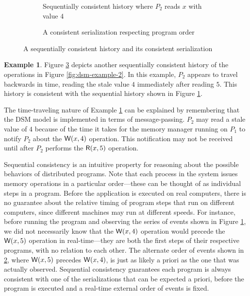 \documentclass[]             %
{NASA}                       %
\theoremstyle{definition}
\newtheorem{example}[theorem]{Example}
\begin{document}
\begin{figure}
  \begin{subfigure}{1\textwidth}
    \setlength\belowcaptionskip{4ex}
    \centering
    
    \caption{Sequentially consistent history where $P_2$ reads $x$ with value $4$}
    \label{fig:dsm-example-2-sequential-2-sub}
  \end{subfigure}
  \begin{subfigure}{1\textwidth}
    
    \caption{A consistent serialization respecting program order}
    \label{fig:dsm-example-2-sequential-2-serial}
  \end{subfigure}
  \caption{A sequentially consistent history and its consistent serialization}
  \label{fig:dsm-example-2-sequential-2}
\end{figure}

\begin{example}
  \label{ex:dsm-example-2-sequential-2}
  Figure \ref{fig:dsm-example-2-sequential-2} depicts another
  sequentially consistent history of the operations in Figure
  \ref{fig:dsm-example-2}. In this example, $P_2$ appears to travel
  backwards in time, reading the stale value $4$ immediately after
  reading $5$. This history is consistent with the sequential history
  shown in Figure \ref{fig:dsm-example-2-sequential-2-sub}.
\end{example}

The time-traveling nature of Example
\ref{ex:dsm-example-2-sequential-2} can be explained by remembering
that the DSM model is implemented in terms of message-passing. $P_2$
may read a stale value of $4$ because of the time it takes for the
memory manager running on $P_1$ to notify $P_2$ about the
$\mathsf{W}\!\left(x, 4\right)$ operation. This notification may not be received
until after $P_2$ performs the $\mathsf{R}\!\left(x, 5\right)$ operation.

Sequential consistency is an intuitive property for reasoning about
the possible behaviors of distributed programs. Note that each process
in the system issues memory operations in a particular order---these
can be thought of as individual steps in a program. Before the
application is executed on real computers, there is no guarantee about
the relative timing of program steps that run on different computers,
since different machines may run at different speeds. For instance,
before running the program and observing the series of events shown in
Figure \ref{fig:dsm-example-2-sequential-2-sub}, we did not
necessarily know that the $\mathsf{W}\!\left(x, 4\right)$ operation would precede
the $\mathsf{W}\!\left(x, 5\right)$ operation in real-time---they are both the first
steps of their respective programs, with no relation to each
other. The alternate order of events shown in
\ref{fig:dsm-example-2-sequential-2-serial}, where $\mathsf{W}\!\left(x, 5\right)$
precedes $\mathsf{W}\!\left(x, 4\right)$, is just as likely a priori as the one that
was actually observed. Sequential consistency guarantees each program
is always consistent with one of the serializations that can be
expected a priori, before the program is executed and a real-time
external order of events is fixed.
\end{document}
